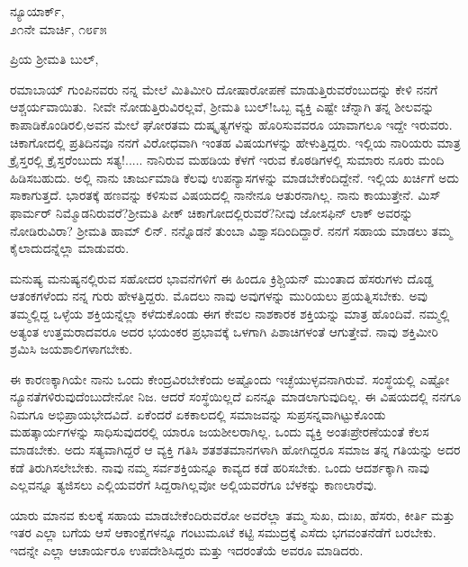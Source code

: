 \begin{flushright}
ನ್ಯೂಯಾರ್ಕ್,\\೨೧ನೇ ಮಾರ್ಚಿ, ೧೮೯೫
\end{flushright}

\vspace{-0.5cm}

\noindent
ಪ್ರಿಯ ಶ‍್ರೀಮತಿ ಬುಲ್,

ರಮಾಬಾಯ್ ಗುಂಪಿನವರು ನನ್ನ ಮೇಲೆ ಮಿತಿಮೀರಿ ದೋಷಾರೋಪಣೆ ಮಾಡುತ್ತಿ\-ರುವರೆಂಬುದನ್ನು ಕೇಳಿ ನನಗೆ ಆಶ್ಚರ್ಯವಾಯಿತು.~ನೀವೇ ನೋಡುತ್ತಿರುವಿರಲ್ಲವೆ, ಶ‍್ರೀಮತಿ ಬುಲ್!ಒಬ್ಬ ವ್ಯಕ್ತಿ ಎಷ್ಟೇ ಚೆನ್ನಾಗಿ ತನ್ನ ಶೀಲವನ್ನು ಕಾಪಾಡಿಕೊಂಡಿರಲಿ,\break ಅವನ ಮೇಲೆ ಘೋರತಮ ದುಷ್ಕೃತ್ಯಗಳನ್ನು ಹೊರಿಸುವವರೂ ಯಾವಾಗಲೂ ಇದ್ದೇ ಇರುವರು. ಚಿಕಾಗೋದಲ್ಲಿ ಪ್ರತಿದಿನವೂ ನನಗೆ ವಿರೋಧವಾಗಿ ಇಂತಹ ವಿಷಯಗಳನ್ನು ಹೇಳುತ್ತಿದ್ದರು. ಇಲ್ಲಿಯ ನಾರಿಯರು ಮಾತ್ರ ಕ್ರೈಸ್ತರಲ್ಲಿ ಕ್ರೈಸ್ತರೆಂಬುದು ಸತ್ಯ!..... ನಾನಿರುವ ಮಹಡಿಯ ಕೆಳಗೆ ಇರುವ ಕೊಠಡಿಗಳಲ್ಲಿ ಸುಮಾರು ನೂರು ಮಂದಿ ಹಿಡಿಸಬಹುದು. ಅಲ್ಲಿ ನಾನು ಚಾರ್ಜುಮಾಡಿ ಕೆಲವು ಉಪನ್ಯಾಸಗಳನ್ನು ಮಾಡಬೇಕೆಂದಿದ್ದೇನೆ. ಇಲ್ಲಿಯ ಖರ್ಚಿಗೆ ಅದು ಸಾಕಾಗುತ್ತದೆ. ಭಾರತಕ್ಕೆ ಹಣವನ್ನು ಕಳಿಸುವ ವಿಷಯದಲ್ಲಿ ನಾನೇನೂ ಆತುರನಾಗಿಲ್ಲ. ನಾನು ಕಾಯುತ್ತೇನೆ. ಮಿಸ್ ಫಾರ್ಮರ್ ನಿಮ್ಮೊಡನಿರುವರೆ?ಶ‍್ರೀಮತಿ ಪೀಕ್ ಚಿಕಾಗೋದಲ್ಲಿರುವರೆ?ನೀವು ಜೋಸಫಿನ್ ಲಾಕ್ ಅವರನ್ನು ನೋಡಿರುವಿರಾ? ಶ‍್ರೀಮತಿ ಹಾಮ್ ಲಿನ್. ನನ್ನೊಡನೆ ತುಂಬಾ ವಿಶ್ವಾಸದಿಂದಿದ್ದಾರೆ. ನನಗೆ ಸಹಾಯ ಮಾಡಲು ತಮ್ಮ ಕೈಲಾದುದನ್ನೆಲ್ಲಾ ಮಾಡುವರು.

ಮನುಷ್ಯ ಮನುಷ್ಯನಲ್ಲಿರುವ ಸಹೋದರ ಭಾವನೆಗಳಿಗೆ ಈ ಹಿಂದೂ ಕ್ರಿಶ್ಚಿಯನ್ ಮುಂತಾದ ಹೆಸರುಗಳು ದೊಡ್ಡ ಆತಂಕಗಳೆಂದು ನನ್ನ ಗುರು ಹೇಳತ್ತಿದ್ದರು. ಮೊದಲು ನಾವು ಅವುಗಳನ್ನು ಮುರಿಯಲು ಪ್ರಯತ್ನಿಸಬೇಕು. ಅವು ತಮ್ಮಲ್ಲಿದ್ದ ಒಳ್ಳೆಯ ಶಕ್ತಿಯನ್ನೆಲ್ಲಾ ಕಳೆದುಕೊಂಡು ಈಗ ಕೇವಲ ನಾಶಕಾರಕ ಶಕ್ತಿಯನ್ನು ಮಾತ್ರ ಹೊಂದಿವೆ. ನಮ್ಮಲ್ಲಿ ಅತ್ಯಂತ ಉತ್ತಮರಾದವರೂ ಅದರ ಭಯಂಕರ ಪ್ರಭಾವಕ್ಕೆ ಒಳಗಾಗಿ ಪಿಶಾಚಿಗಳಂತೆ ಆಗುತ್ತೇವೆ. ನಾವು ಶಕ್ತಿಮೀರಿ ಶ್ರಮಿಸಿ ಜಯಶಾಲಿಗಳಾಗಬೇಕು.

ಈ ಕಾರಣಕ್ಕಾಗಿಯೇ ನಾನು ಒಂದು ಕೇಂದ್ರವಿರಬೇಕೆಂದು ಅಷ್ಟೊಂದು ಇಚ್ಛೆಯುಳ್ಳವನಾಗಿರುವೆ. ಸಂಸ್ಥೆಯಲ್ಲಿ ಎಷ್ಟೋ ನ್ಯೂನತೆಗಳಿರುವುದೆಂಬುದೇನೋ ನಿಜ. ಆದರೆ ಸಂಸ್ಥೆಯಿಲ್ಲದೆ ಏನನ್ನೂ ಮಾಡಲಾಗುವುದಿಲ್ಲ. ಈ ವಿಷಯದಲ್ಲಿ ನನಗೂ ನಿಮಗೂ ಅಭಿಪ್ರಾಯಭೇದವಿದೆ. ಏಕೆಂದರೆ ಏಕಕಾಲದಲ್ಲಿ ಸಮಾಜವನ್ನು ಸುಪ್ರಸನ್ನವಾಗಿಟ್ಟುಕೊಂಡು ಮಹತ್ಕಾರ್ಯಗಳನ್ನು ಸಾಧಿಸುವುದರಲ್ಲಿ ಯಾರೂ ಜಯಶೀಲರಾಗಿಲ್ಲ. ಒಂದು ವ್ಯಕ್ತಿ ಅಂತಃಪ್ರೇರಣೆಯಂತೆ ಕೆಲಸ ಮಾಡಬೇಕು. ಅದು ಸತ್ಯವಾಗಿದ್ದರೆ ಆ ವ್ಯಕ್ತಿ ಗತಿಸಿ ಶತಶತಮಾನಗಳಾಗಿ ಹೋಗಿದ್ದರೂ ಸಮಾಜ ತನ್ನ ಗತಿಯನ್ನು ಅದರ ಕಡೆ ತಿರುಗಿಸಲೇಬೇಕು. ನಾವು ನಮ್ಮ ಸರ್ವಶಕ್ತಿಯನ್ನೂ ಕಾವ್ಯದ ಕಡೆ ಹರಿಸಬೇಕು. ಒಂದು ಆದರ್ಶಕ್ಕಾಗಿ ನಾವು ಎಲ್ಲವನ್ನೂ ತ್ಯಜಿಸಲು ಎಲ್ಲಿಯವರೆಗೆ ಸಿದ್ದರಾಗಿಲ್ಲವೋ ಅಲ್ಲಿಯವರೆಗೂ ಬೆಳಕನ್ನು ಕಾಣಲಾರೆವು.

ಯಾರು ಮಾನವ ಕುಲಕ್ಕೆ ಸಹಾಯ ಮಾಡಬೇಕೆಂದಿರುವರೋ ಅವರೆಲ್ಲಾ ತಮ್ಮ ಸುಖ, ದುಃಖ, ಹೆಸರು, ಕೀರ್ತಿ ಮತ್ತು ಇತರ ಎಲ್ಲಾ ಬಗೆಯ ಆಸೆ ಆಕಾಂಕ್ಷೆಗಳನ್ನೂ ಗಂಟುಮೂಟೆ ಕಟ್ಟಿ ಸಮುದ್ರಕ್ಕೆ ಎಸೆದು ಭಗವಂತನೆಡೆಗೆ ಬರಬೇಕು. ಇದನ್ನೇ ಎಲ್ಲಾ ಆಚಾರ್ಯರೂ ಉಪದೇಶಿಸಿದ್ದರು ಮತ್ತು ಇದರಂತೆಯೆ ಅವರೂ ಮಾಡಿದರು.

\eject

